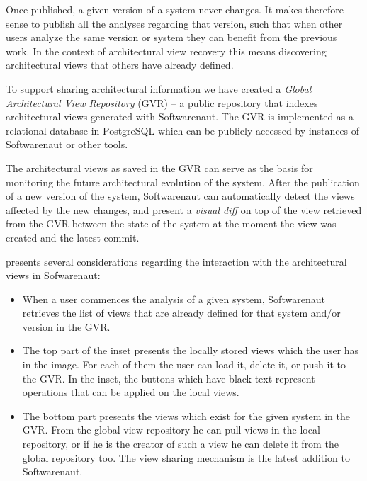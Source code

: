 \documentclass[preprint,12pt]{elsarticle}
\begin{document}



Once published, a given version of a system never changes. It makes therefore sense to publish all the analyses regarding that version, such that when other users analyze the same version or system they can benefit from the previous work. In the context of architectural view recovery this means discovering architectural views that others have already defined. 


To support sharing architectural information we have created a {\em Global Architectural View Repository} (GVR) -- a public repository that indexes architectural views generated with Softwarenaut. The GVR is implemented as a relational database in PostgreSQL which can be publicly accessed by instances of Softwarenaut or other tools. %

The architectural views as saved in the GVR can serve as the basis for monitoring the future architectural evolution of the system. After the publication of a new version of the system, Softwarenaut can automatically detect the views affected by the new changes, and present a {\em visual diff} on top of the view retrieved from the GVR between the state of the system at the moment the view was created and the latest commit.



 presents several considerations regarding the interaction with the architectural views in Sofwarenaut: 

\begin{itemize}

\item When a user commences the analysis of a given system, Softwarenaut retrieves the list of views that are already defined for that system and/or version in the GVR.

\item The top part of the inset presents the locally stored views which the user has in the image. For each of them the user can load it, delete it, or push it to the GVR. In the inset, the buttons which have black text represent operations that can be applied on the local views.

\item The bottom part presents the views which exist for the given system in the GVR. From the global view repository he can pull views in the local repository, or if he is the creator of such a view he can delete it from the global repository too. The view sharing mechanism is the latest addition to Softwarenaut.
\end{itemize}
\end{document}
